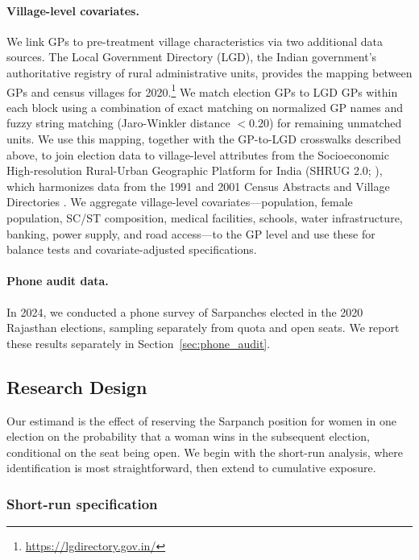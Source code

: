 \documentclass[12pt]{article}
\begin{document}
\paragraph{Village-level covariates.} We link GPs to pre-treatment village characteristics via two additional data sources. The Local Government Directory (LGD), the Indian government's authoritative registry of rural administrative units, provides the mapping between GPs and census villages for 2020.\footnote{\url{https://lgdirectory.gov.in/}} We match election GPs to LGD GPs within each block using a combination of exact matching on normalized GP names and fuzzy string matching (Jaro-Winkler distance $< 0.20$) for remaining unmatched units. We use this mapping, together with the GP-to-LGD crosswalks described above, to join election data to village-level attributes from the Socioeconomic High-resolution Rural-Urban Geographic Platform for India (SHRUG 2.0; \citealp{asher2019socioeconomic}), which harmonizes data from the 1991 and 2001 Census Abstracts and Village Directories \citep{pcindia, chandramouli2011census}. We aggregate village-level covariates---population, female population, SC/ST composition, medical facilities, schools, water infrastructure, banking, power supply, and road access---to the GP level and use these for balance tests and covariate-adjusted specifications.

\paragraph{Phone audit data.} In 2024, we conducted a phone survey of Sarpanches elected in the 2020 Rajasthan elections, sampling separately from quota and open seats. We report these results separately in Section~\ref{sec:phone_audit}.

\subsection{Research Design}

Our estimand is the effect of reserving the Sarpanch position for women in one election on the probability that a woman wins in the subsequent election, conditional on the seat being open. We begin with the short-run analysis, where identification is most straightforward, then extend to cumulative exposure.

\subsubsection*{Short-run specification}
\end{document}
